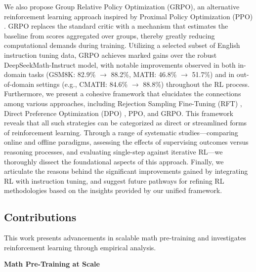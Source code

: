 We also propose Group Relative Policy Optimization (GRPO), an alternative reinforcement learning approach inspired by Proximal Policy Optimization (PPO) \citep{schulman2017proximal}. GRPO replaces the standard critic with a mechanism that estimates the baseline from scores aggregated over groups, thereby greatly reducing computational demands during training. Utilizing a selected subset of English instruction tuning data, GRPO achieves marked gains over the robust DeepSeekMath-Instruct model, with notable improvements observed in both in-domain tasks (GSM8K: 82.9\% $\rightarrow$ 88.2\%, MATH: 46.8\% $\rightarrow$ 51.7\%) and in out-of-domain settings (e.g., CMATH: 84.6\% $\rightarrow$ 88.8\%) throughout the RL process. Furthermore, we present a cohesive framework that elucidates the connections among various approaches, including Rejection Sampling Fine-Tuning (RFT) \citep{yuan2023scaling}, Direct Preference Optimization (DPO) \citep{dpo}, PPO, and GRPO. This framework reveals that all such strategies can be categorized as direct or streamlined forms of reinforcement learning. Through a range of systematic studies—comparing online and offline paradigms, assessing the effects of supervising outcomes versus reasoning processes, and evaluating single-step against iterative RL—we thoroughly dissect the foundational aspects of this approach. Finally, we articulate the reasons behind the significant improvements gained by integrating RL with instruction tuning, and suggest future pathways for refining RL methodologies based on the insights provided by our unified framework.

\subsection{Contributions}
This work presents advancements in scalable math pre-training and investigates reinforcement learning through empirical analysis.

\textbf{Math Pre-Training at Scale}

